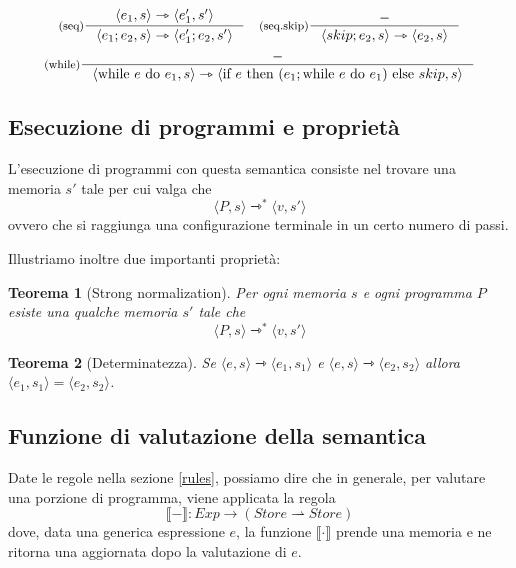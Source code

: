 \documentclass[a4paper, 11pt]{article}
\newtheorem{thm}{Teorema}[section]
\newcommand{\sem}[1]{\llbracket #1 \rrbracket}
\begin{document}
\begin{adjustwidth}{-1.3cm}{}
\begin{align*}
	& & \\
	&\inference[(seq)]{\langle e_1, s \rangle \rightarrowtriangle \langle e_1', s' \rangle}{\langle e_1;e_2, s \rangle \rightarrowtriangle \langle e_1';e_2, s' \rangle} & \inference[(seq.skip)]{-}{\langle skip; e_2, s \rangle \rightarrowtriangle \langle e_2,s \rangle} \\
	\end{align*}
	\begin{align*}
	& \inference[(while)]{-}{ \langle \text{while } e \text{ do } e_1,s \rangle \rightarrowtriangle \langle \text{if } e \text{ then } (e_1; \text{while } e \text{ do } e_1) \text{ else } skip,s \rangle} \\
\end{align*}
\end{adjustwidth}

\subsection{Esecuzione di programmi e proprietà}
L'esecuzione di programmi con questa semantica consiste nel trovare una memoria $s'$ tale per cui valga che \[ \langle P, s \rangle \rightarrowtriangle^\ast \langle v, s' \rangle \] ovvero che si raggiunga una configurazione terminale in un certo numero di passi.

Illustriamo inoltre due importanti proprietà:
\begin{thm}[Strong normalization]
	Per ogni memoria $s$ e ogni programma $P$  esiste una qualche memoria $s'$ tale che \[ \langle P,s \rangle \rightarrowtriangle^\ast \langle v,s' \rangle  \]
\end{thm}

\begin{thm}[Determinatezza]
	Se $\langle e,s \rangle  \rightarrowtriangle \langle e_1, s_1 \rangle $ e $\langle e,s \rangle  \rightarrowtriangle \langle e_2, s_2 \rangle $ allora $\langle e_1, s_1 \rangle = \langle e_2, s_2 \rangle$.
\end{thm}

\subsection{Funzione di valutazione della semantica}
Date le regole nella sezione \ref{rules}, possiamo dire che in generale, per valutare una porzione di programma, viene applicata la regola \[ \sem{-}: Exp \to (Store \rightharpoonup Store) \]
dove, data una generica espressione $e$, la funzione $\sem{ \cdot}$ prende una memoria e ne ritorna una aggiornata dopo la valutazione di $e$.
\end{document}
